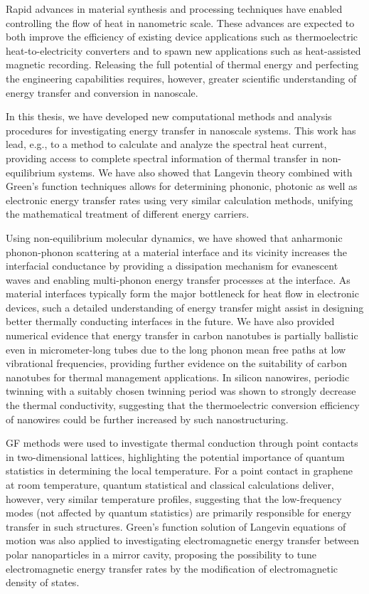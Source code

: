 
Rapid advances in material synthesis and processing techniques have enabled controlling the flow of heat in nanometric scale. These advances are expected to both improve the efficiency of existing device applications such as thermoelectric heat-to-electricity converters and to spawn new applications such as heat-assisted magnetic recording. Releasing the full potential of thermal energy and perfecting the engineering capabilities requires, however, greater scientific understanding of energy transfer and conversion in nanoscale.

In this thesis, we have developed new computational methods and analysis procedures for investigating energy transfer in nanoscale systems. This work has lead, e.g., to a method to calculate and analyze the spectral heat current, providing access to complete spectral information of thermal transfer in non-equilibrium systems. We have also showed that Langevin theory combined with Green's function techniques allows for determining phononic, photonic as well as electronic energy transfer rates using very similar calculation methods, unifying the mathematical treatment of different energy carriers. %

Using non-equilibrium molecular dynamics, we have showed that anharmonic phonon-phonon scattering at a material interface and its vicinity increases the interfacial conductance by providing a dissipation mechanism for evanescent waves and enabling multi-phonon energy transfer processes at the interface. As material interfaces typically form the major bottleneck for heat flow in electronic devices, such a detailed understanding of energy transfer might assist in designing better thermally conducting interfaces in the future. We have also provided numerical evidence that energy transfer in carbon nanotubes is partially ballistic even in micrometer-long tubes due to the long phonon mean free paths at low vibrational frequencies, providing further evidence on the suitability of carbon nanotubes for thermal management applications. In silicon nanowires, periodic twinning with a suitably chosen twinning period was shown to strongly decrease the thermal conductivity, suggesting that the thermoelectric conversion efficiency of nanowires could be further increased by such nanostructuring. 

GF methods were used to investigate thermal conduction through point contacts in two-dimensional lattices, highlighting the potential importance of quantum statistics in determining the local temperature. For a point contact in graphene at room temperature, quantum statistical and classical calculations deliver, however, very similar temperature profiles, suggesting that the low-frequency modes (not affected by quantum statistics) are primarily responsible for energy transfer in such structures. Green's function solution of Langevin equations of motion was also applied to investigating electromagnetic energy transfer between polar nanoparticles in a mirror cavity, proposing the possibility to tune electromagnetic energy transfer rates by the modification of electromagnetic density of states. 

